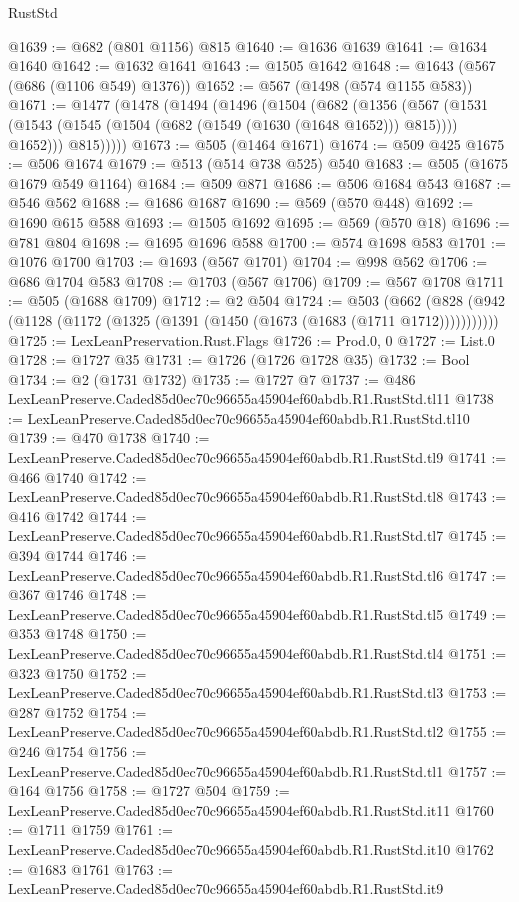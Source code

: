 \begin{lexlean}{RustStd}
\begin{coremodule}
@1639 := @682 (@801 @1156) @815
@1640 := @1636 @1639
@1641 := @1634 @1640
@1642 := @1632 @1641
@1643 := @1505 @1642
@1648 := @1643 (@567 (@686 (@1106 @549) @1376))
@1652 := @567 (@1498 (@574 @1155 @583))
@1671 := @1477
    (@1478
      (@1494
        (@1496
          (@1504
            (@682
              (@1356
                (@567
                  (@1531 (@1543 (@1545 (@1504 (@682 (@1549 (@1630 (@1648 @1652))) @815)))) @1652)))
              @815)))))
@1673 := @505 (@1464 @1671)
@1674 := @509 @425
@1675 := @506 @1674
@1679 := @513 (@514 @738 @525) @540
@1683 := @505 (@1675 @1679 @549 @1164)
@1684 := @509 @871
@1686 := @506 @1684 @543
@1687 := @546 @562
@1688 := @1686 @1687
@1690 := @569 (@570 @448)
@1692 := @1690 @615 @588
@1693 := @1505 @1692
@1695 := @569 (@570 @18)
@1696 := @781 @804
@1698 := @1695 @1696 @588
@1700 := @574 @1698 @583
@1701 := @1076 @1700
@1703 := @1693 (@567 @1701)
@1704 := @998 @562
@1706 := @686 @1704 @583
@1708 := @1703 (@567 @1706)
@1709 := @567 @1708
@1711 := @505 (@1688 @1709)
@1712 := @2 @504
@1724 := @503
    (@662 (@828 (@942 (@1128 (@1172 (@1325 (@1391 (@1450 (@1673 (@1683 (@1711 @1712)))))))))))
@1725 := LexLeanPreservation.Rust.Flags
@1726 := Prod.{0, 0}
@1727 := List.{0}
@1728 := @1727 @35
@1731 := @1726 (@1726 @1728 @35)
@1732 := Bool
@1734 := @2 (@1731 @1732)
@1735 := @1727 @7
@1737 := @486 LexLeanPreserve.Caded85d0ec70c96655a45904ef60abdb.R1.RustStd.tl11
@1738 := LexLeanPreserve.Caded85d0ec70c96655a45904ef60abdb.R1.RustStd.tl10
@1739 := @470 @1738
@1740 := LexLeanPreserve.Caded85d0ec70c96655a45904ef60abdb.R1.RustStd.tl9
@1741 := @466 @1740
@1742 := LexLeanPreserve.Caded85d0ec70c96655a45904ef60abdb.R1.RustStd.tl8
@1743 := @416 @1742
@1744 := LexLeanPreserve.Caded85d0ec70c96655a45904ef60abdb.R1.RustStd.tl7
@1745 := @394 @1744
@1746 := LexLeanPreserve.Caded85d0ec70c96655a45904ef60abdb.R1.RustStd.tl6
@1747 := @367 @1746
@1748 := LexLeanPreserve.Caded85d0ec70c96655a45904ef60abdb.R1.RustStd.tl5
@1749 := @353 @1748
@1750 := LexLeanPreserve.Caded85d0ec70c96655a45904ef60abdb.R1.RustStd.tl4
@1751 := @323 @1750
@1752 := LexLeanPreserve.Caded85d0ec70c96655a45904ef60abdb.R1.RustStd.tl3
@1753 := @287 @1752
@1754 := LexLeanPreserve.Caded85d0ec70c96655a45904ef60abdb.R1.RustStd.tl2
@1755 := @246 @1754
@1756 := LexLeanPreserve.Caded85d0ec70c96655a45904ef60abdb.R1.RustStd.tl1
@1757 := @164 @1756
@1758 := @1727 @504
@1759 := LexLeanPreserve.Caded85d0ec70c96655a45904ef60abdb.R1.RustStd.it11
@1760 := @1711 @1759
@1761 := LexLeanPreserve.Caded85d0ec70c96655a45904ef60abdb.R1.RustStd.it10
@1762 := @1683 @1761
@1763 := LexLeanPreserve.Caded85d0ec70c96655a45904ef60abdb.R1.RustStd.it9

\end{coremodule}
\end{lexlean}
